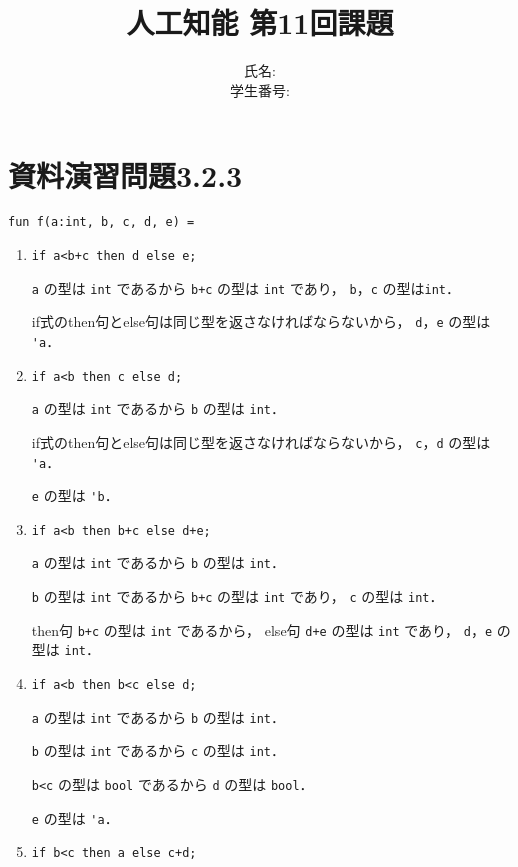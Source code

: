 \documentclass[a4paper, lualatex, ja=standard]{bxjsarticle}
\title{人工知能 第11回課題}
\author{氏名:  \\ 学生番号: }
\begin{document}
\maketitle

\section{資料演習問題3.2.3}

\verb|fun f(a:int, b, c, d, e) =|
\begin{enumerate}[label=\alph*)]
\item \verb|if a<b+c then d else e;|

  \verb|a| の型は \verb|int| であるから \verb|b+c| の型は \verb|int| であり，
  \verb|b|，\verb|c| の型は\verb|int|．

  if式のthen句とelse句は同じ型を返さなければならないから，
  \verb|d|，\verb|e| の型は \verb|'a|．

\item \verb|if a<b then c else d;|

  \verb|a| の型は \verb|int| であるから \verb|b| の型は \verb|int|．

  if式のthen句とelse句は同じ型を返さなければならないから，
  \verb|c|，\verb|d| の型は \verb|'a|．

  \verb|e| の型は \verb|'b|．

\item \verb|if a<b then b+c else d+e;|

  \verb|a| の型は \verb|int| であるから \verb|b| の型は \verb|int|．

  \verb|b| の型は \verb|int| であるから \verb|b+c| の型は \verb|int| であり，
  \verb|c| の型は \verb|int|．

  then句 \verb|b+c| の型は \verb|int| であるから，
  else句 \verb|d+e| の型は \verb|int| であり，
  \verb|d|，\verb|e| の型は \verb|int|．

\item \verb|if a<b then b<c else d;|

  \verb|a| の型は \verb|int| であるから \verb|b| の型は \verb|int|．

  \verb|b| の型は \verb|int| であるから \verb|c| の型は \verb|int|．

  \verb|b<c| の型は \verb|bool| であるから \verb|d| の型は \verb|bool|．

  \verb|e| の型は \verb|'a|． 

\item \verb|if b<c then a else c+d;|


\end{enumerate}
\end{document}
